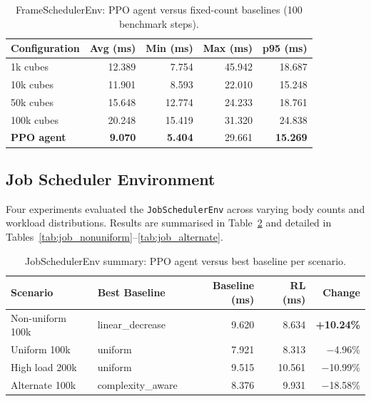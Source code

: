 \documentclass[9pt,openany]{extbook}
\begin{document}
\begin{table}[H]
  \centering
  \caption{FrameSchedulerEnv: PPO agent versus fixed-count baselines
           (100 benchmark steps).}
  \label{tab:frame_scheduler}
  \begin{tabular}{lrrrr}
    \toprule
    Configuration & Avg (ms) & Min (ms) & Max (ms) & p95 (ms) \\
    \midrule
    1k cubes    & 12.389 & 7.754  & 45.942 & 18.687 \\
    10k cubes   & 11.901 & 8.593  & 22.010 & 15.248 \\
    50k cubes   & 15.648 & 12.774 & 24.233 & 18.761 \\
    100k cubes  & 20.248 & 15.419 & 31.320 & 24.838 \\
    \midrule
    \textbf{PPO agent} & \textbf{9.070} & \textbf{5.404} & 29.661 & \textbf{15.269} \\
    \bottomrule
  \end{tabular}
\end{table}

\subsection{Job Scheduler Environment}

Four experiments evaluated the \texttt{JobSchedulerEnv} across varying body
counts and workload distributions.  Results are summarised in
Table~\ref{tab:job_scheduler_summary} and detailed in
Tables~\ref{tab:job_nonuniform}--\ref{tab:job_alternate}.

\begin{table}[H]
  \centering
  \caption{JobSchedulerEnv summary: PPO agent versus best baseline
           per scenario.}
  \label{tab:job_scheduler_summary}
  \begin{tabular}{llrrr}
    \toprule
    Scenario & Best Baseline & Baseline (ms) & RL (ms) & Change \\
    \midrule
    Non-uniform 100k  & linear\_decrease & 9.620  & 8.634  & \textbf{+10.24\%} \\
    Uniform 100k      & uniform          & 7.921  & 8.313  & $-$4.96\%  \\
    High load 200k    & uniform          & 9.515  & 10.561 & $-$10.99\% \\
    Alternate 100k    & complexity\_aware & 8.376 & 9.931  & $-$18.58\% \\
    \bottomrule
  \end{tabular}
\end{table}
\end{document}
